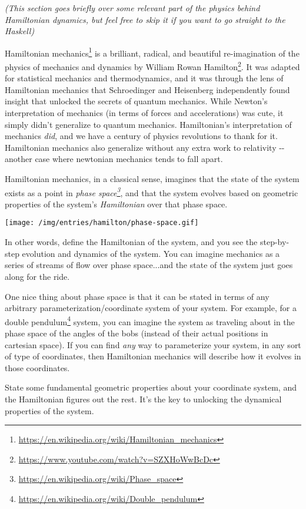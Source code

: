 \documentclass[]{article}
\renewcommand{\href}[2]{#2\footnote{\url{#1}}}
\begin{document}
\emph{(This section goes briefly over some relevant part of the physics behind
Hamiltonian dynamics, but feel free to skip it if you want to go straight to the
Haskell)}

\href{https://en.wikipedia.org/wiki/Hamiltonian_mechanics}{Hamiltonian
mechanics} is a brilliant, radical, and beautiful re-imagination of the physics
of mechanics and dynamics by
\href{https://www.youtube.com/watch?v=SZXHoWwBcDc}{William Rowan Hamilton}. It
was adapted for statistical mechanics and thermodynamics, and it was through the
lens of Hamiltonian mechanics that Schroedinger and Heisenberg independently
found insight that unlocked the secrets of quantum mechanics. While Newton's
interpretation of mechanics (in terms of forces and accelerations) was cute, it
simply didn't generalize to quantum mechanics. Hamiltonian's interpretation of
mechanics \emph{did}, and we have a century of physics revolutions to thank for
it. Hamiltonian mechanics also generalize without any extra work to relativity
-\/- another case where newtonian mechanics tends to fall apart.

Hamiltonian mechanics, in a classical sense, imagines that the state of the
system exists as a point in
\emph{\href{https://en.wikipedia.org/wiki/Phase_space}{phase space}}, and that
the system evolves based on geometric properties of the system's
\emph{Hamiltonian} over that phase space.

\texttt{[image: /img/entries/hamilton/phase-space.gif]}

In other words, define the Hamiltonian of the system, and you see the
step-by-step evolution and dynamics of the system. You can imagine mechanics as
a series of streams of flow over phase space...and the state of the system just
goes along for the ride.

One nice thing about phase space is that it can be stated in terms of any
arbitrary parameterization/coordinate system of your system. For example, for a
\href{https://en.wikipedia.org/wiki/Double_pendulum}{double pendulum} system,
you can imagine the system as traveling about in the phase space of the angles
of the bobs (instead of their actual positions in cartesian space). If you can
find \emph{any} way to parameterize your system, in any sort of type of
coordinates, then Hamiltonian mechanics will describe how it evolves in those
coordinates.

State some fundamental geometric properties about your coordinate system, and
the Hamiltonian figures out the rest. It's the key to unlocking the dynamical
properties of the system.
\end{document}
